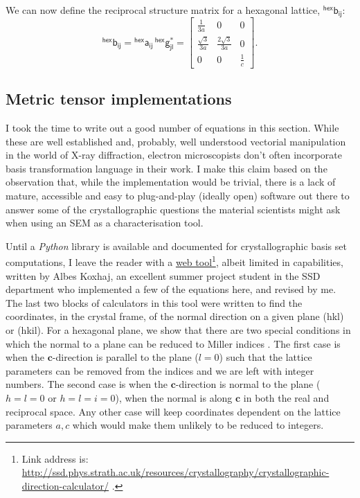 We can now define the reciprocal structure matrix for a hexagonal lattice, $\mathsf{^{hex}b_{ij}}$:
\begin{equation}
\mathsf{^{hex}b_{ij}} = \mathsf{^{hex}a_{ij}} \, \mathsf{^{hex}g^*_{jl}} = \begin{bmatrix}
\frac{1}{3a} & 0 & 0 \\[0.3em]
\frac{\sqrt{3}}{3a} & \frac{2\sqrt{3}}{3a} & 0 \\[0.3em]
0 & 0 & \frac{1}{c}
\end{bmatrix}.
\end{equation}

\subsection{Metric tensor implementations}
I took the time to write out a good number of equations in this section. While these are well established and, probably, well  understood vectorial manipulation in the world of X-ray diffraction, electron microscopists don't often incorporate basis transformation language in their work. I make this claim based on the observation that, while the implementation would be trivial, there is a lack of mature, accessible and easy to plug-and-play (ideally open) software out there to answer some of the crystallographic questions the material scientists might ask when using an SEM as a characterisation tool. 

Until a \textit{Python} library is available and documented for crystallographic basis set computations, I leave the reader with a \href{http://ssd.phys.strath.ac.uk/resources/crystallography/crystallographic-direction-calculator/}{web tool}\footnote{ Link address is: \href{http://ssd.phys.strath.ac.uk/resources/crystallography/crystallographic-direction-calculator/}{http://ssd.phys.strath.ac.uk/resources/crystallography/crystallographic-direction-calculator/} .}, albeit limited in capabilities, written by Albes Koxhaj, an excellent summer project student in the SSD department who implemented a few of the equations here, and revised by me. The last two blocks of calculators in this tool were written to find the coordinates, in the crystal frame, of the normal direction on a given plane \hkl(hkl) or \hkl(hkil). For a hexagonal plane, we show that there are two special conditions in which the normal to a plane can be reduced to Miller indices \hkl[uvw]. The first case is when the $\mathbf{c}$-direction is parallel to the plane ($l=0$) such that the lattice parameters can be removed from the indices and we are left with integer numbers. The second case is when the $\mathbf{c}$-direction is normal to the plane ($h=l=0$ or $h=l=i=0$), when the normal is along $\mathbf{c}$ in both the real and reciprocal space. Any other case will keep coordinates dependent on the lattice parameters $a, c$ which would make them unlikely to be reduced to integers. 

